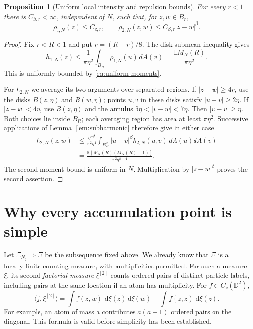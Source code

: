 \documentclass[11pt,a4paper]{article}
\numberwithin{equation}{section}
\newtheorem{proposition}[theorem]{Proposition}
\theoremstyle{remark}
\newcommand{\D}{\mathbb D}
\newcommand{\E}{\mathbb E}
\newcommand{\dd}{\,\mathrm d}
\begin{document}
\begin{proposition}[Uniform local intensity and repulsion bounds]
\label{prop:repulsion}
For every $r<1$ there is $C_{\beta,r}<\infty$, independent of $N$,
such that, for $z,w\in\overline{B_r}$,
\begin{equation}\label{eq:repulsion}
 \rho_{1,N}(z)\le C_{\beta,r},\qquad
 \rho_{2,N}(z,w)\le C_{\beta,r}|z-w|^\beta.
\end{equation}
\end{proposition}
\begin{proof}
Fix $r<R<1$ and put $\eta=(R-r)/8$.
The disk submean inequality gives
\[
 h_{1,N}(z)\le\frac{1}{\pi\eta^2}
       \int_{B_R}\rho_{1,N}(u)\,dA(u)
 =\frac{\E M_N(R)}{\pi\eta^2}.
\]
This is uniformly bounded by \eqref{eq:uniform-moments}.

For $h_{2,N}$ we average its two arguments over separated regions.
If $|z-w|\ge4\eta$, use the disks $B(z,\eta)$ and $B(w,\eta)$;
points $u,v$ in these disks satisfy $|u-v|\ge2\eta$.
If $|z-w|<4\eta$, use $B(z,\eta)$ and the annulus
$6\eta<|v-w|<7\eta$. Then $|u-v|\ge\eta$.
Both choices lie inside $B_R$; each averaging region has area at
least $\pi\eta^2$. Successive applications of
Lemma~\ref{lem:subharmonic} therefore give in either case
\begin{align*}
 h_{2,N}(z,w)
 &\le\frac{\eta^{-\beta}}{\pi^2\eta^4}
       \int_{B_R^2}|u-v|^\beta h_{2,N}(u,v)\,dA(u)dA(v)\\
 &=\frac{\E[M_N(R)(M_N(R)-1)]}{\pi^2\eta^{\beta+4}}.
\end{align*}
The second moment bound is uniform in $N$.
Multiplication by $|z-w|^\beta$ proves the second assertion.
\end{proof}

\section{Why every accumulation point is simple}

Let $\Xi_{N_j}\Rightarrow\Xi$ be the subsequence fixed above.
We already know that $\Xi$ is a locally finite counting measure,
with multiplicities permitted. For such a measure $\xi$, its second
\emph{factorial measure} $\xi^{[2]}$ counts ordered pairs of distinct
particle labels, including pairs at the same location if an atom has
multiplicity. For $f\in C_c(\D^2)$,
\begin{equation}\label{eq:factorial-functional}
 \langle f,\xi^{[2]}\rangle
 =\int f(z,w)\,\dd\xi(z)\dd\xi(w)
       -\int f(z,z)\,\dd\xi(z).
\end{equation}
For example, an atom of mass $a$ contributes $a(a-1)$ ordered
pairs on the diagonal. This formula is valid before simplicity has
been established.
\end{document}
